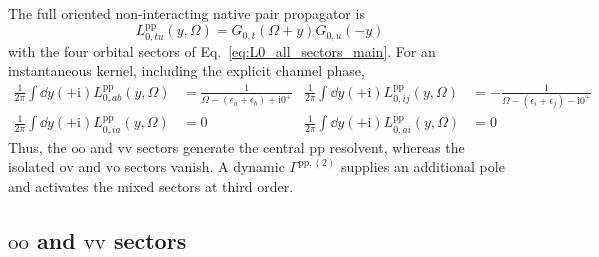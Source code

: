 \documentclass[aip,jcp,reprint,noshowkeys,superscriptaddress]{revtex4-1}
\newcommand{\eps}{\epsilon}
\newcommand{\ii}{\mathrm{i}}
\newcommand{\pp}{\text{pp}}
\begin{document}
The full oriented non-interacting
native pair propagator is
\begin{equation}
    L_{0,tu}^{\pp}(y,\Omega)
    =
    G_{0,t}(\Omega+y)G_{0,u}(-y)
    \label{eq:L0_pp_oriented}
\end{equation}
with the four orbital sectors of Eq.~\eqref{eq:L0_all_sectors_main}.
For an instantaneous kernel, including the explicit channel phase,
\begin{align}
    \frac{1}{2\pi}\int\dd{y}
    (+\ii) L_{0,ab}^{\pp}(y,\Omega)
    &=
    \frac{1}{\Omega-(\eps_a+\eps_b)+\ii0^+}
    &
    \frac{1}{2\pi}\int\dd{y}
    (+\ii) L_{0,ij}^{\pp}(y,\Omega)
    &=
    -\frac{1}{\Omega-(\eps_i+\eps_j)-\ii0^+}
    \label{eq:pp_oo_vv_integral}
    \\
    \frac{1}{2\pi}\int\dd{y}
    (+\ii) L_{0,ia}^{\pp}(y,\Omega)
    &=0
    &
    \frac{1}{2\pi}\int\dd{y}
    (+\ii) L_{0,ai}^{\pp}(y,\Omega)
    &=0
    \label{eq:pp_mixed_integrals_zero}
\end{align}
Thus, the $\text{oo}$ and $\text{vv}$ sectors generate the central $\pp$ resolvent, whereas
the isolated $\text{ov}$ and $\text{vo}$ sectors vanish.
A dynamic $\Gamma^{\pp,(2)}$ supplies an additional pole and activates the
mixed sectors at third order.

\subsection{$\text{oo}$ and $\text{vv}$ sectors}
\end{document}
